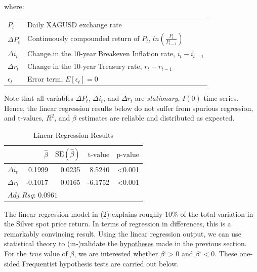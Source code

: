 \documentclass[
  12pt,
]{article}
\begin{document}
\begin{footnotesize}
where:

\begin{tabular}{ll}

$P_t$ & Daily XAGUSD exchange rate\\
$\Delta P_t$ & Continuously compounded return of $\scriptstyle P_t$, $\scriptstyle ln \left( \frac{P_t}{P_{t-1}} \right)$\\
$\Delta i_t$ & Change in the 10-year Breakeven Inflation rate, $\scriptstyle i_t - i_{t-1}$\\
$\Delta r_t$ & Change in the 10-year Treasury rate, $\scriptstyle r_t - r_{t-1}$\\
$\epsilon_t$ & Error term, $E[\epsilon_t] = 0$\\

\end{tabular}
\end{footnotesize}

Note that all variables \(\Delta P_t\), \(\Delta i_t\), and
\(\Delta r_t\) are \emph{stationary}, \(I(0)\) time-series. Hence, the
linear regression results below do not suffer from spurious regression,
and t-values, \(R^2\), and \(\beta\) estimates are reliable and
distributed as expected.

\begin{table}[!h]

\caption{\label{tab:lm-fit}Linear Regression Results}
\centering
\begin{tabular}[t]{lrrrr}
\toprule
  & $\hat{\beta}$ & $\textrm{SE}(\hat{\beta})$ & $\textrm{t-value}$ & $\textrm{p-value}$\\
\midrule
$\Delta i_t$ & 0.1999 & 0.0235 & 8.5240 & <0.001\\
$\Delta r_t$ & -0.1017 & 0.0165 & -6.1752 & <0.001\\
\bottomrule
\multicolumn{5}{l}{\rule{0pt}{1em}$\textit{Adj Rsq: 0.0961}$}\\
\end{tabular}
\end{table}

The linear regression model in (2) explains roughly 10\% of the total
variation in the Silver spot price return. In terms of regression in
differences, this is a remarkably convincing result. Using the linear
regression output, we can use statistical theory to (in-)validate the
\protect\hyperlink{silver-spot-pricing-hypothesis}{hypotheses} made in
the previous section. For the \emph{true} value of \(\beta\), we are
interested whether \(\beta^{_i} > 0\) and \(\beta^{_r} < 0\). These
one-sided Frequentist hypothesis tests are carried out below.
\end{document}
